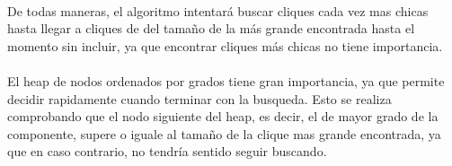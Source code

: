 \paragraph{}
De todas maneras, el algoritmo intentará buscar cliques cada vez mas chicas hasta llegar a cliques de del tamaño de la más grande encontrada hasta el momento sin incluir, ya que encontrar cliques más chicas no tiene importancia. 


\paragraph{}
El heap de nodos ordenados por grados tiene gran importancia, ya que permite decidir rapidamente cuando terminar con la busqueda. Esto se realiza comprobando que el nodo siguiente del heap, es decir, el de mayor grado de la componente, supere o iguale al tamaño de la clique mas grande encontrada, ya que en caso contrario, no tendría sentido seguir buscando.
